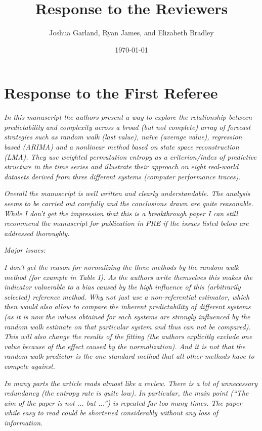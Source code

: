 \documentclass[12pt]{article}
\title{Response to the Reviewers}
\author{Joshua Garland, Ryan James, and Elizabeth Bradley}
\date{\today}
\begin{document}
\maketitle

\section*{Response to the First Referee}

\emph{In this manuscript the authors present a way to explore the relationship
between predictability and complexity across a broad (but not complete) array of
forecast strategies such as random walk (last value), na\"ive (average value),
regression based (ARIMA) and a nonlinear method based on state space
reconstruction (LMA). They use weighted permutation entropy as a criterion/index
of predictive structure in the time series and illustrate their approach on
eight real-world datasets derived from three different systems (computer
performance traces).}

\emph{Overall the manuscript is well written and clearly understandable. The
analysis seems to be carried out carefully and the conclusions drawn are quite
reasonable. While I don't get the impression that this is a breakthrough paper I
can still recommend the manuscript for publication in PRE if the issues listed
below are addressed thoroughly.}

\noindent\emph{Major issues:}

\emph{I don't get the reason for normalizing the three methods by the random
walk method (for example in Table I). As the authors write themselves this makes
the indicator vulnerable to a bias caused by the high influence of this
(arbitrarily selected) reference method. Why not just use a non-referential
estimator, which then would also allow to compare the inherent predictability of
different systems (as it is now the values obtained for each systems are
strongly influenced by the random walk estimate on that particular system and
thus can not be compared). This will also change the results of the fitting (the
authors explicitly exclude one value because of the effect caused by the
normalization). And it is not that the random walk predictor is the one standard
method that all other methods have to compete against.}

\emph{In many parts the article reads almost like a review. There is a lot of
unnecessary redundancy (the entropy rate is quite low). In particular, the main
point (``The aim of the paper is not ... but ...'') is repeated far too many
times. The paper while easy to read could be shortened considerably without any
loss of information.}
\end{document}
